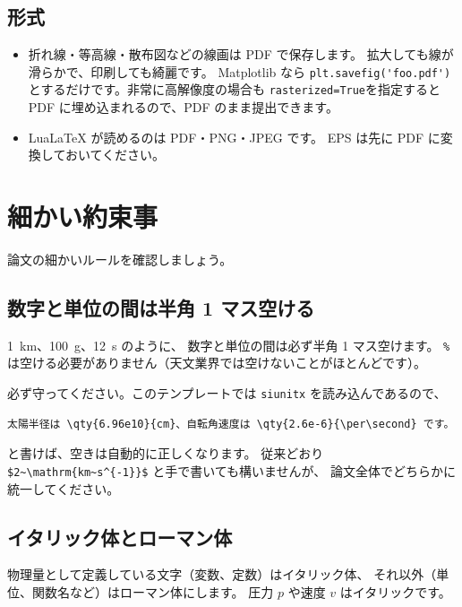 \subsection{形式}

\begin{itemize}
  \item 折れ線・等高線・散布図などの線画は PDF で保存します。
    拡大しても線が滑らかで、印刷しても綺麗です。
    Matplotlib なら \verb|plt.savefig('foo.pdf')| とするだけです。非常に高解像度の場合も \verb|rasterized=True|を指定すると PDF に埋め込まれるので、PDF のまま提出できます。
  \item LuaLaTeX が読めるのは PDF・PNG・JPEG です。
    EPS は先に PDF に変換しておいてください。
\end{itemize}

\section{細かい約束事}
\label{sec:guide_manner}

論文の細かいルールを確認しましょう。

\subsection{数字と単位の間は半角 1 マス空ける}

\qty{1}{\km}、\qty{100}{\gram}、\qty{12}{\second} のように、
数字と単位の間は必ず半角 1 マス空けます。
\verb|%| は空ける必要がありません（天文業界では空けないことがほとんどです）。

必ず守ってください。このテンプレートでは \texttt{siunitx} を読み込んであるので、

\begin{verbatim}
太陽半径は \qty{6.96e10}{cm}、自転角速度は \qty{2.6e-6}{\per\second} です。
\end{verbatim}

\noindent
と書けば、空きは自動的に正しくなります。
従来どおり \verb|$2~\mathrm{km~s^{-1}}$| と手で書いても構いませんが、
論文全体でどちらかに統一してください。

\subsection{イタリック体とローマン体}

物理量として定義している文字（変数、定数）はイタリック体、
それ以外（単位、関数名など）はローマン体にします。
圧力 $p$ や速度 $v$ はイタリックです。

